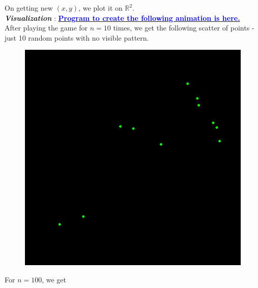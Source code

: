 \documentclass[11pt, a4paper]{article}
\begin{document}
On getting new $(x, y)$, we plot it on $\mathbb{R}^2$. \\

\faArrowAltCircleRight[regular] \textcolor{col1}{\textbf{\textit{Visualization}}} : \href{https://github.com/sakunisgithub/R-programming/blob/master/msc_sem_1_practicals/mahaveer_sir_assignments/assignment_03/assignment_03.R}{\textcolor{blue}{\textbf{Program to create the following animation is here.}}} \\

After playing the game for $n = 10$ times, we get the following scatter of points - just 10 random points with no visible pattern.

\begin{figure}[h]
\centering
\includegraphics[scale=0.3]{01}
\end{figure}

\newpage

For $n = 100$, we get
\end{document}
